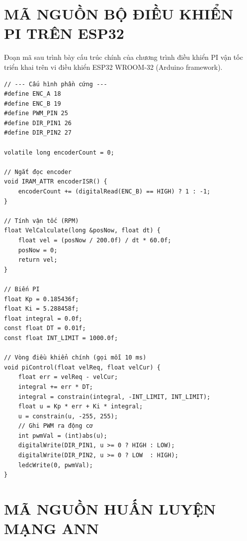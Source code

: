 
\appendix
\renewcommand{\chaptername}{Phụ lục}

\chapter{MÃ NGUỒN BỘ ĐIỀU KHIỂN PI TRÊN ESP32}
\label{app:esp32_code}

Đoạn mã sau trình bày cấu trúc chính của chương trình điều khiển PI vận tốc
triển khai trên vi điều khiển ESP32 WROOM-32 (Arduino framework).

\begin{verbatim}
// --- Cấu hình phần cứng ---
#define ENC_A 18
#define ENC_B 19
#define PWM_PIN 25
#define DIR_PIN1 26
#define DIR_PIN2 27

volatile long encoderCount = 0;

// Ngắt đọc encoder
void IRAM_ATTR encoderISR() {
    encoderCount += (digitalRead(ENC_B) == HIGH) ? 1 : -1;
}

// Tính vận tốc (RPM)
float VelCalculate(long &posNow, float dt) {
    float vel = (posNow / 200.0f) / dt * 60.0f;
    posNow = 0;
    return vel;
}

// Biến PI
float Kp = 0.185436f;
float Ki = 5.288458f;
float integral = 0.0f;
const float DT = 0.01f;
const float INT_LIMIT = 1000.0f;

// Vòng điều khiển chính (gọi mỗi 10 ms)
void piControl(float velReq, float velCur) {
    float err = velReq - velCur;
    integral += err * DT;
    integral = constrain(integral, -INT_LIMIT, INT_LIMIT);
    float u = Kp * err + Ki * integral;
    u = constrain(u, -255, 255);
    // Ghi PWM ra động cơ
    int pwmVal = (int)abs(u);
    digitalWrite(DIR_PIN1, u >= 0 ? HIGH : LOW);
    digitalWrite(DIR_PIN2, u >= 0 ? LOW  : HIGH);
    ledcWrite(0, pwmVal);
}
\end{verbatim}


\chapter{MÃ NGUỒN HUẤN LUYỆN MẠNG ANN}
\label{app:ann_code}

